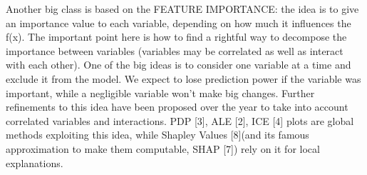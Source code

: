     Another big class is based on the FEATURE IMPORTANCE: the idea is to give an importance value to each variable, depending on how much it influences the f(x). The important point here is how to find a rightful way to decompose the importance between variables (variables may be correlated as well as interact with each other).
    One of the big ideas is to consider one variable at a time and exclude it from the model. We expect to lose prediction power if the variable was important, while a negligible variable won’t make big changes. Further refinements to this idea have been proposed over the year to take into account correlated variables and interactions.
    PDP [3], ALE [2], ICE [4] plots are global methods exploiting this idea, while Shapley Values [8](and its famous approximation to make them computable, SHAP [7]) rely on it for local explanations.